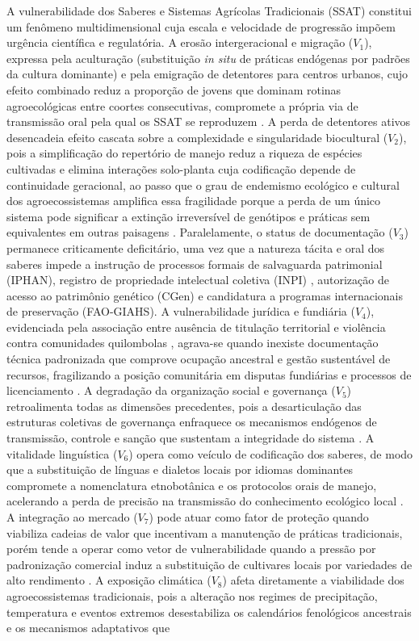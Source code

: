 A vulnerabilidade dos Saberes e Sistemas Agrícolas Tradicionais (SSAT) constitui um fenômeno multidimensional cuja escala e velocidade de progressão impõem urgência científica e regulatória. A erosão intergeracional e migração ($V_{1}$), expressa pela aculturação (substituição \textit{in situ} de práticas endógenas por padrões da cultura dominante) e pela emigração de detentores para centros urbanos, cujo efeito combinado reduz a proporção de jovens que dominam rotinas agroecológicas entre coortes consecutivas, compromete a própria via de transmissão oral pela qual os SSAT se reproduzem \cite{ReyesGarcia2013,GomezBaggethun2013}. A perda de detentores ativos desencadeia efeito cascata sobre a complexidade e singularidade biocultural ($V_{2}$), pois a simplificação do repertório de manejo reduz a riqueza de espécies cultivadas e elimina interações solo-planta cuja codificação depende de continuidade geracional, ao passo que o grau de endemismo ecológico e cultural dos agroecossistemas amplifica essa fragilidade porque a perda de um único sistema pode significar a extinção irreversível de genótipos e práticas sem equivalentes em outras paisagens \cite{Jarvis2008,Brush2004,Bussmann2018,CalvetMir2016}. Paralelamente, o status de documentação ($V_{3}$) permanece criticamente deficitário, uma vez que a natureza tácita e oral dos saberes impede a instrução de processos formais de salvaguarda patrimonial (IPHAN), registro de propriedade intelectual coletiva (INPI) \cite{INPI2023}, autorização de acesso ao patrimônio genético (CGen) \cite{brasil2015lei13123} e candidatura a programas internacionais de preservação (FAO-GIAHS). A vulnerabilidade jurídica e fundiária ($V_{4}$), evidenciada pela associação entre ausência de titulação territorial e violência contra comunidades quilombolas \cite{conaq2023racismo}, agrava-se quando inexiste documentação técnica padronizada que comprove ocupação ancestral e gestão sustentável de recursos, fragilizando a posição comunitária em disputas fundiárias e processos de licenciamento \cite{Santilli2009}. A degradação da organização social e governança ($V_{5}$) retroalimenta todas as dimensões precedentes, pois a desarticulação das estruturas coletivas de governança enfraquece os mecanismos endógenos de transmissão, controle e sanção que sustentam a integridade do sistema \cite{Agrawal2002,Folke2016}. A vitalidade linguística ($V_{6}$) opera como veículo de codificação dos saberes, de modo que a substituição de línguas e dialetos locais por idiomas dominantes compromete a nomenclatura etnobotânica e os protocolos orais de manejo, acelerando a perda de precisão na transmissão do conhecimento ecológico local \cite{CamaraLeret2021,Maffi2001}. A integração ao mercado ($V_{7}$) pode atuar como fator de proteção quando viabiliza cadeias de valor que incentivam a manutenção de práticas tradicionais, porém tende a operar como vetor de vulnerabilidade quando a pressão por padronização comercial induz a substituição de cultivares locais por variedades de alto rendimento \cite{Godoy2005,ReyesGarcia2013}. A exposição climática ($V_{8}$) afeta diretamente a viabilidade dos agroecossistemas tradicionais, pois a alteração nos regimes de precipitação, temperatura e eventos extremos desestabiliza os calendários fenológicos ancestrais e os mecanismos adaptativos que 